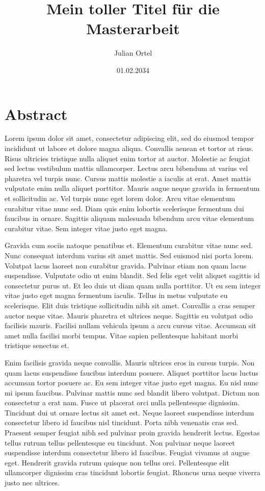 \documentclass[
  11pt,
  a4paper,
  openright,
  cleardoublepage=plain,
  parskip=half+, %
]{scrreprt}
\title{Mein toller Titel für die Masterarbeit}
\author{Julian Ortel}
\date{01.02.2034}
\begin{document}




\tableofcontents
\newpage


\hypertarget{abstract}{%
\chapter*{Abstract}\label{abstract}}

Lorem ipsum dolor sit amet, consectetur adipiscing elit, sed do eiusmod
tempor incididunt ut labore et dolore magna aliqua. Convallis aenean et
tortor at risus. Risus ultricies tristique nulla aliquet enim tortor at
auctor. Molestie ac feugiat sed lectus vestibulum mattis ullamcorper.
Lectus arcu bibendum at varius vel pharetra vel turpis nunc. Cursus
mattis molestie a iaculis at erat. Amet mattis vulputate enim nulla
aliquet porttitor. Mauris augue neque gravida in fermentum et
sollicitudin ac. Vel turpis nunc eget lorem dolor. Arcu vitae elementum
curabitur vitae nunc sed. Diam quis enim lobortis scelerisque fermentum
dui faucibus in ornare. Sagittis aliquam malesuada bibendum arcu vitae
elementum curabitur vitae. Sem integer vitae justo eget magna.

Gravida cum sociis natoque penatibus et. Elementum curabitur vitae nunc
sed. Nunc consequat interdum varius sit amet mattis. Sed euismod nisi
porta lorem. Volutpat lacus laoreet non curabitur gravida. Pulvinar
etiam non quam lacus suspendisse. Vulputate odio ut enim blandit. Sed
felis eget velit aliquet sagittis id consectetur purus ut. Et leo duis
ut diam quam nulla porttitor. Ut eu sem integer vitae justo eget magna
fermentum iaculis. Tellus in metus vulputate eu scelerisque. Elit duis
tristique sollicitudin nibh sit amet. Convallis a cras semper auctor
neque vitae. Mauris pharetra et ultrices neque. Sagittis eu volutpat
odio facilisis mauris. Facilisi nullam vehicula ipsum a arcu cursus
vitae. Accumsan sit amet nulla facilisi morbi tempus. Vitae sapien
pellentesque habitant morbi tristique senectus et.

Enim facilisis gravida neque convallis. Mauris ultrices eros in cursus
turpis. Non quam lacus suspendisse faucibus interdum posuere. Aliquet
porttitor lacus luctus accumsan tortor posuere ac. Eu sem integer vitae
justo eget magna. Eu nisl nunc mi ipsum faucibus. Pulvinar mattis nunc
sed blandit libero volutpat. Dictum non consectetur a erat nam. Fusce ut
placerat orci nulla pellentesque dignissim. Tincidunt dui ut ornare
lectus sit amet est. Neque laoreet suspendisse interdum consectetur
libero id faucibus nisl tincidunt. Porta nibh venenatis cras sed.
Praesent semper feugiat nibh sed pulvinar proin gravida hendrerit
lectus. Egestas tellus rutrum tellus pellentesque eu tincidunt. Non
pulvinar neque laoreet suspendisse interdum consectetur libero id
faucibus. Feugiat vivamus at augue eget. Hendrerit gravida rutrum
quisque non tellus orci. Pellentesque elit ullamcorper dignissim cras
tincidunt lobortis feugiat. Rhoncus urna neque viverra justo nec
ultrices.
\end{document}

